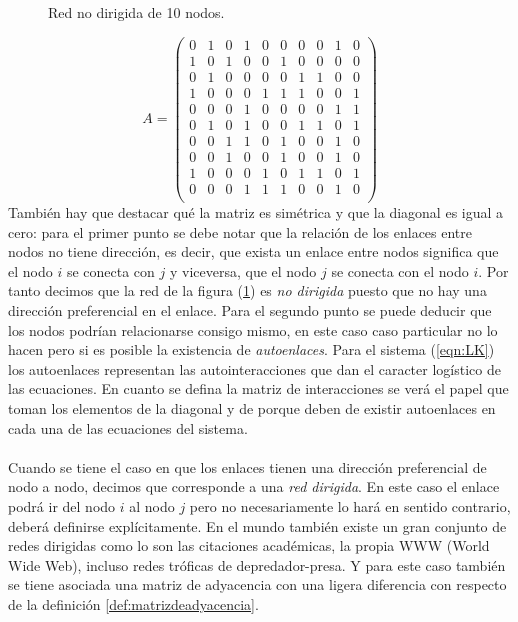 \begin{figure} \vspace{-30pt} \begin{center}
		 
	\end{center} 
	\vspace{-20pt} 
	\caption{Red no dirigida de 10 nodos.} 
	\vspace{-150pt}
	\label{fig:Red10}
\end{figure} 

$$
A=\begin{pmatrix}
	0 & 1 & 0 & 1 & 0 & 0 & 0 & 0 & 1 & 0 \\
	1 & 0 & 1 & 0 & 0 & 1 & 0 & 0 & 0 & 0 \\
	0 & 1 & 0 & 0 & 0 & 0 & 1 & 1 & 0 & 0 \\
	1 & 0 & 0 & 0 & 1 & 1 & 1 & 0 & 0 & 1 \\
	0 & 0 & 0 & 1 & 0 & 0 & 0 & 0 & 1 & 1 \\
	0 & 1 & 0 & 1 & 0 & 0 & 1 & 1 & 0 & 1 \\
	0 & 0 & 1 & 1 & 0 & 1 & 0 & 0 & 1 & 0 \\
	0 & 0 & 1 & 0 & 0 & 1 & 0 & 0 & 1 & 0 \\
	1 & 0 & 0 & 0 & 1 & 0 & 1 & 1 & 0 & 1 \\
	0 & 0 & 0 & 1 & 1 & 1 & 0 & 0 & 1 & 0 \\
\end{pmatrix}
$$
También hay que destacar qué la matriz es simétrica y que la diagonal es igual a cero: para el primer punto se debe notar que la relación de los enlaces entre nodos no tiene dirección, es decir, que exista un enlace entre nodos significa que el nodo $i$ se conecta con $j$ y viceversa, que el nodo $j$ se conecta con el nodo $i$. Por tanto decimos que la red de la figura (\ref{fig:Red10}) es \textit{no dirigida} puesto que no hay una dirección preferencial en el enlace. Para el segundo punto se puede deducir que los nodos podrían relacionarse consigo mismo, en este caso caso particular no lo hacen pero si es posible la existencia de \textit{autoenlaces}. Para el sistema (\ref{eqn:LK}) los autoenlaces representan las autointeracciones que dan el caracter logístico de las ecuaciones. En cuanto se defina la matriz de interacciones se verá el papel que toman los elementos de la diagonal y de porque deben de existir autoenlaces en cada una de las ecuaciones del sistema.	
\\
\\
Cuando se tiene el caso en que los enlaces tienen una dirección preferencial de nodo a nodo, decimos que corresponde a una \textit{red dirigida}. En este caso el enlace podrá ir del nodo $i$ al nodo $j$ pero no necesariamente lo hará en sentido contrario, deberá definirse explícitamente. En el mundo también existe un gran conjunto de redes dirigidas como lo son las citaciones académicas, la propia WWW (World Wide Web), incluso redes tróficas de depredador-presa. Y para este caso también se tiene asociada una matriz de adyacencia con una ligera diferencia con respecto de la definición \ref{def:matrizdeadyacencia}.
